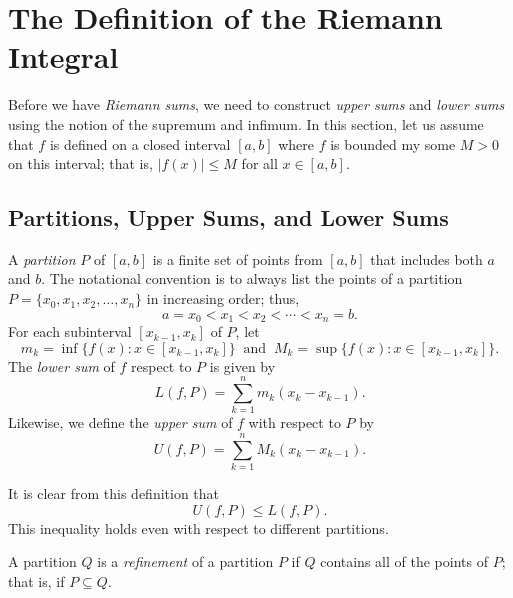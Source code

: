 \section{The Definition of the Riemann Integral}

Before we have \textit{Riemann sums}, we need to construct \textit{upper sums}  and \textit{lower sums} using the notion of the supremum and infimum. In this section, let us assume that \( f  \) is defined on a closed interval \( [a,b]  \) where \( f  \) is bounded my some \( M > 0  \) on this interval; that is, \( | f(x)  | \leq M  \) for all \( x \in [a,b] \). 

\subsection{Partitions, Upper Sums, and Lower Sums}

\begin{tcolorbox}
\begin{defn}
	A \textit{partition} \( P  \) of \( [a,b]  \) is a finite set of points from \( [a,b]  \) that includes both \( a  \) and \( b  \). The notational convention is to always list the points of a partition \( P = \{ x_{0}, x_{1}, x_{2}, \dots, x_{n} \}  \) in increasing order; thus, \[  a = x_{0} < x_{1} < x_{2} < \dotsb < x_{n} = b. \]
	For each subinterval \( [x_{k-1}, x_{k} ] \) of \( P  \), let 
	\[  m_{k } = \inf \{ f(x) : x \in [x_{k-1} , x_{k } ] \} \ \text{ and } \  M_{k } = \sup \{ f(x) : x \in [x_{k-1}, x_{k }] \}. \]
	The \textit{lower sum} of \( f  \) respect to \( P  \) is given by 
	\[  L(f, P ) = \sum_{ k=1 }^{ n } m_{ k } ( x_{k } -  x_{ k -1 }). \]
	Likewise, we define the \textit{upper sum} of \( f  \) with respect to \( P  \) by 
	\[  U(f, P ) = \sum_{ k=1 }^{ n } M_k ( x_{k } - x_{ k -1 }). \]
\end{defn}
\end{tcolorbox}

It is clear from this definition that 
\[  U(f, P ) \leq L(f, P ).\]  This inequality holds even with respect to different partitions.

\begin{tcolorbox}
\begin{defn}
A partition \( Q  \) is a \textit{refinement} of a partition \( P  \) if \( Q  \) contains all of the points of \( P  \); that is, if \( P \subseteq Q  \).



\end{defn}
\end{tcolorbox}

